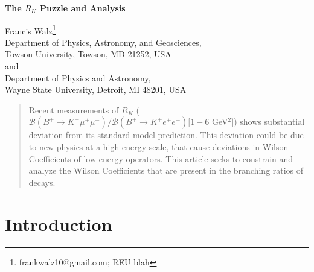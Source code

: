\documentclass[12pt]{article}
\begin{document}
    \begin{center}
        \vspace*{1cm}
        
        \Huge
        \textbf{The $R_K$ Puzzle and Analysis}
        
        \vskip 20pt
        
        \large{Francis Walz}\footnote{frankwalz10@gmail.com; REU blah}\\ Department of Physics, Astronomy, and Geosciences, \\ Towson University, Towson, MD 21252, USA \\
          and \\
        Department of Physics and Astronomy, \\ Wayne State University, Detroit, MI 48201, USA
        
        \begin{abstract}
        Recent measurements of $R_K$ ($\mathcal{B}(B^+\rightarrow K^+\mu^+\mu^-)/ \mathcal{B}(B^+\rightarrow K^+e^+e^-) [1-6$  GeV$^2]$) shows substantial deviation from its standard model prediction. This deviation could be due to new physics at a high-energy scale, that cause deviations in Wilson Coefficients of low-energy operators. This article seeks to constrain and analyze the Wilson Coefficients that are present in the branching ratios of decays.  
        \end{abstract}
        \vfill
    \end{center}
    
\tableofcontents

\section{Introduction}
\end{document}
